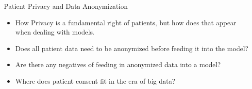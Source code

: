\documentclass[10pt, xcolor=table]{beamer}
\begin{document}
\begin{frame}{Patient Privacy and Data Anonymization}
	\begin{itemize}
		\item How Privacy is a fundamental right of patients, but how does that appear when dealing with models.
		\item Does all patient data need to be anonymized before feeding it into the model?
		\item Are there any negatives of feeding in anonymized data into a model?
		\item Where does patient consent fit in the era of big data?
	\end{itemize}
\end{frame}
\end{document}
